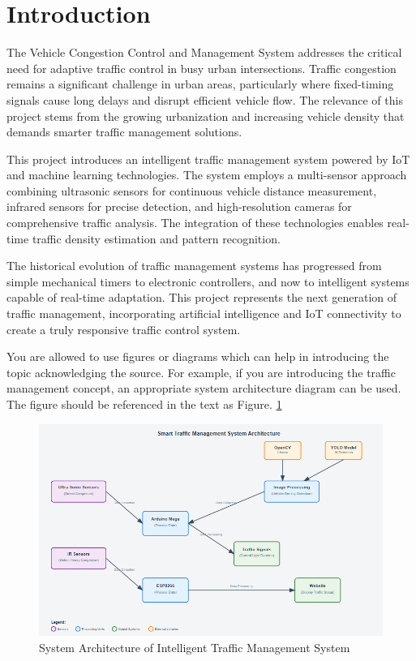 \documentclass[12pt]{report}
\begin{document}
\section[Introduction]{\textbf{Introduction}}

The Vehicle Congestion Control and Management System addresses the critical need for adaptive traffic control in busy urban intersections. Traffic congestion remains a significant challenge in urban areas, particularly where fixed-timing signals cause long delays and disrupt efficient vehicle flow. The relevance of this project stems from the growing urbanization and increasing vehicle density that demands smarter traffic management solutions.

This project introduces an intelligent traffic management system powered by IoT and machine learning technologies. The system employs a multi-sensor approach combining ultrasonic sensors for continuous vehicle distance measurement, infrared sensors for precise detection, and high-resolution cameras for comprehensive traffic analysis. The integration of these technologies enables real-time traffic density estimation and pattern recognition.

The historical evolution of traffic management systems has progressed from simple mechanical timers to electronic controllers, and now to intelligent systems capable of real-time adaptation. This project represents the next generation of traffic management, incorporating artificial intelligence and IoT connectivity to create a truly responsive traffic control system.

You are allowed to use figures or diagrams which can help in introducing the topic acknowledging the source. For example, if you are introducing the traffic management concept, an appropriate system architecture diagram can be used. The figure should be referenced in the text as Figure. \ref{fig:system_architecture} 
\begin{figure}[htb]
\centering
	\includegraphics[scale=1]{Figures/system_architecture}	
	\caption{System Architecture of Intelligent Traffic Management System}
	\label{fig:system_architecture}
\end{figure}
\end{document}
